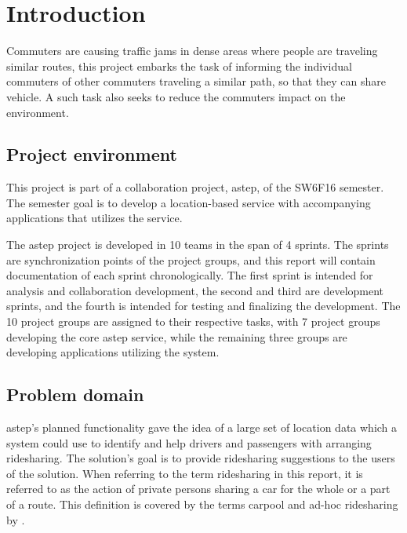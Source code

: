 \chapter{Introduction}\label{ch:introduction}


Commuters are causing traffic jams in dense areas where people are traveling similar routes, this project embarks the task of informing the individual commuters of other commuters traveling a similar path, so that they can share vehicle.
A such task also seeks to reduce the commuters impact on the environment.

\section{Project environment}
This project is part of a collaboration project, \gls{astep}, of the SW6F16 semester.
The semester goal is to develop a location-based service with accompanying applications that utilizes the service. 

The \gls{astep} project is developed in 10 teams in the span of 4 sprints.
The sprints are synchronization points of the project groups, and this report will contain documentation of each sprint chronologically.
The first sprint is intended for analysis and collaboration development, the second and third are development sprints, and the fourth is intended for testing and finalizing the development.
The 10 project groups are assigned to their respective tasks, with 7 project groups developing the core \gls{astep} service, while the remaining three groups are developing applications utilizing the system.

\section{Problem domain}
\gls{astep}'s planned functionality gave the idea of a large set of location data which a system could use to identify and help drivers and passengers with arranging ridesharing.
The solution's goal is to provide ridesharing suggestions to the users of the solution.
When referring to the term ridesharing in this report, it is referred to as the action of private persons sharing a car for the whole or a part of a route. 
This definition is covered by the terms carpool and ad-hoc ridesharing by \citet{doi:10.1080/01441647.2011.621557}.  

